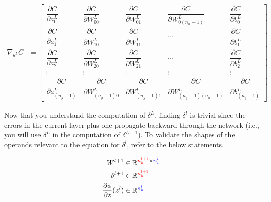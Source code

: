\documentclass{article}
\newcommand{\colorvar}[2]{
	\begingroup\color{#1}{#2}\endgroup
}
\begin{document}
\begin{align}
	\nabla_{\theta^{L}} C & =
	\begin{bmatrix}
		\dfrac{\partial C}{\partial a_{0}^{L}}           & \dfrac{\partial C}{\partial W_{00}^{L}}           & \dfrac{\partial C}{\partial W_{01}^{L}}         & \dfrac{\partial C}{\partial W_{0(n_{h}-1)}^{L}}         & \dfrac{\partial C}{\partial b_{0}^{L}}         \\
		\dfrac{\partial C}{\partial a_{1}^{L}}           & \dfrac{\partial C}{\partial W_{10}^{L}}           & \dfrac{\partial C}{\partial W_{11}^{L}}         & \cdots                                                  & \dfrac{\partial C}{\partial b_{1}^{L}}         \\
		\dfrac{\partial C}{\partial a_{2}^{L}}           & \dfrac{\partial C}{\partial W_{20}^{L}}           & \dfrac{\partial C}{\partial W_{21}^{L}}         & \cdots                                                  & \dfrac{\partial C}{\partial b_{2}^{L}}         \\
		\vdots                                           & \vdots                                            & \vdots                                          & \vdots                                                  & \vdots                                         \\
		\dfrac{\partial C}{\partial a_{(n_{y} - 1)}^{L}} & \dfrac{\partial C}{\partial W_{(n_{y} - 1)0}^{L}} & \dfrac{\partial C}{\partial W_{(n_{y}-1)1}^{L}} & \dfrac{\partial C}{\partial W_{(n_{y}-1)(n_{h}-1)}^{L}} & \dfrac{\partial C}{\partial b_{(n_{y}-1)}^{L}}
	\end{bmatrix}
\end{align}

Now that you understand the computation of $\delta^{L}$, finding $\delta^{l}$
is trivial since the errors in the current layer plus one propagate backward through
the network (i.e., you will use $\delta^{L}$ in the computation of $\delta^{L-1}$).
To validate the shapes of the operands relevant to the equation for $\delta^{l}$,
refer to the below statements.

\begin{align}
	W^{l+1}                                 & \in \mathbb{R}^{\colorvar{red}{n_h^{l+1}} \times \colorvar{blue}{n_{h}^{l}}} \\
	\delta^{l+1}                            & \in \mathbb{R}^{\colorvar{red}{n_h^{l+1}}}                                   \\
	\frac{\partial \phi}{\partial z}(z^{l}) & \in \mathbb{R}^{\colorvar{blue}{n_{h}^{l}}}
\end{align}
\end{document}
